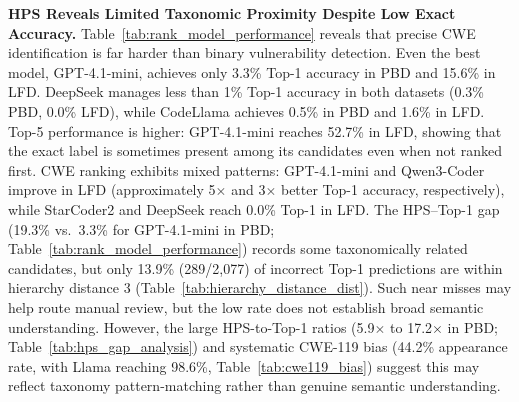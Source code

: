 \documentclass[lettersize,journal]{IEEEtran}
\begin{document}
\textbf{HPS Reveals Limited Taxonomic Proximity Despite Low Exact Accuracy.} Table~\ref{tab:rank_model_performance} reveals that precise \gls{CWE} identification is far harder than binary vulnerability detection. Even the best model, GPT-4.1-mini, achieves only 3.3\% Top-1 accuracy in PBD and 15.6\% in LFD. DeepSeek manages less than 1\% Top-1 accuracy in both datasets (0.3\% PBD, 0.0\% LFD), while CodeLlama achieves 0.5\% in PBD and 1.6\% in LFD. Top-5 performance is higher: GPT-4.1-mini reaches 52.7\% in LFD, showing that the exact label is sometimes present among its candidates even when not ranked first. \gls{CWE} ranking exhibits mixed patterns: GPT-4.1-mini and Qwen3-Coder improve in LFD (approximately 5$\times$ and 3$\times$ better Top-1 accuracy, respectively), while StarCoder2 and DeepSeek reach 0.0\% Top-1 in LFD. The HPS--Top-1 gap (19.3\% vs.\ 3.3\% for GPT-4.1-mini in PBD; Table~\ref{tab:rank_model_performance}) records some taxonomically related candidates, but only 13.9\% (289/2,077) of incorrect Top-1 predictions are within hierarchy distance 3 (Table~\ref{tab:hierarchy_distance_dist}). Such near misses may help route manual review, but the low rate does not establish broad semantic understanding.
However, the large HPS-to-Top-1 ratios (5.9$\times$ to 17.2$\times$ in PBD; Table~\ref{tab:hps_gap_analysis}) and systematic CWE-119 bias (44.2\% appearance rate, with Llama reaching 98.6\%, Table~\ref{tab:cwe119_bias}) suggest this may reflect taxonomy pattern-matching rather than genuine semantic understanding.
\end{document}
